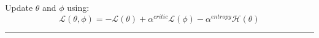 \documentclass[varwidth, border=20pt]{standalone}
\begin{document}
\begin{center}
\begin{minipage}{0.99\linewidth}
\begin{algorithmic}[1]
         \State Update $\theta$ and $\phi$ using: 
         \[ 
             \mathcal{L}(\theta,\phi) = - \mathcal{L}(\theta) + \alpha^{critic} \mathcal{L}(\phi) -  \alpha^{entropy} \mathcal{H}(\theta)
         \]

      \EndWhile
    \end{algorithmic}

    \vspace{6pt}
    \hrule height 0.7pt
  \end{minipage}
\end{center}
\endgroup
\end{document}

